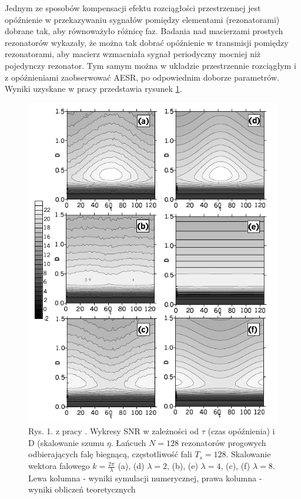   Jednym ze sposobów kompensacji efektu rozciągłości przestrzennej jest opóźnienie w przekazywaniu sygnałów pomiędzy elementami (rezonatorami) dobrane tak, aby równoważyło różnicę faz. Badania nad macierzami prostych rezonatorów \cite{ijmpb_23_2} wykazały, że można tak dobrać opóźnienie w transmisji pomiędzy rezonatorami, aby macierz wzmacniała sygnał periodyczny mocniej niż pojedynczy rezonator. Tym samym można w układzie przestrzennie rozciągłym i z opóźnieniami zaobserwować AESR, po odpowiednim doborze parametrów. Wyniki uzyskane w pracy \cite{ijmpb_23_2} przedstawia rysunek \ref{fig:graphics:krawiecki_jezo}.

  \begin{figure}
    \includegraphics[width=120mm]{images/krawiecki_jezo_1.png}
    \caption{Rys. 1. z pracy \cite{ijmpb_23_2}. Wykresy SNR w zależności od $\tau$ (czas opóźnienia) i D (skalowanie szumu $\eta$. Łańcuch $N=128$ rezonatorów progowych odbierających falę biegnącą, częstotliwość fali $T_s = 128$. Skalowanie wektora falowego $k=\frac{2\pi}{\lambda}$ (a), (d) $\lambda = 2$, (b), (e) $\lambda = 4$, (c), (f) $\lambda = 8$. Lewa kolumna - wyniki symulacji numerycznej, prawa kolumna - wyniki obliczeń teoretycznych}
    \label{fig:graphics:krawiecki_jezo}
  \end{figure}

